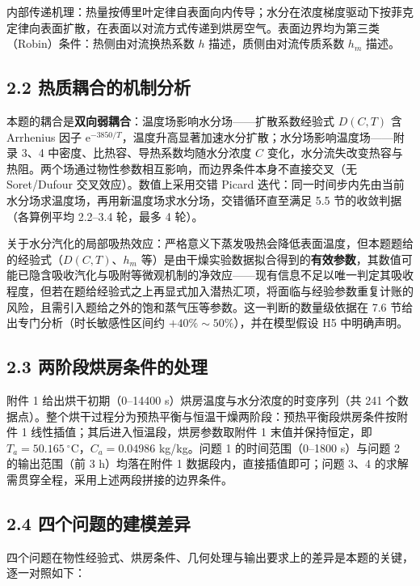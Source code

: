\documentclass[12pt,a4paper]{ctexart}
\begin{document}
内部传递机理：热量按傅里叶定律自表面向内传导\cite{incropera,yang}；水分在浓度梯度驱动下按菲克定律向表面扩散，在表面以对流方式传递到烘房空气。表面边界均为第三类（Robin）条件：热侧由对流换热系数 $h$ 描述，质侧由对流传质系数 $h_m$ 描述。

\subsection{2.2 热质耦合的机制分析}

本题的耦合是\textbf{双向弱耦合}：温度场影响水分场——扩散系数经验式 $D(C,T)$ 含 Arrhenius 因子 $\mathrm{e}^{-3850/T}$，温度升高显著加速水分扩散；水分场影响温度场——附录 3、4 中密度、比热容、导热系数均随水分浓度 $C$ 变化，水分流失改变热容与热阻。两个场通过物性参数相互影响，而边界条件本身不直接交叉（无 Soret/Dufour 交叉效应）。数值上采用交错 Picard 迭代：同一时间步内先由当前水分场求温度场，再用新温度场求水分场，交错循环直至满足 5.5 节的收敛判据（各算例平均 2.2--3.4 轮，最多 4 轮）。

关于水分汽化的局部吸热效应：严格意义下蒸发吸热会降低表面温度，但本题题给的经验式（$D(C,T)$、$h_m$ 等）是由干燥实验数据拟合得到的\textbf{有效参数}，其数值可能已隐含吸收汽化与吸附等微观机制的净效应——现有信息不足以唯一判定其吸收程度，但若在题给经验式之上再显式加入潜热汇项，将面临与经验参数重复计账的风险，且需引入题给之外的饱和蒸气压等参数。这一判断的数量级依据在 7.6 节给出专门分析（时长敏感性区间约 $+40\%\sim50\%$），并在模型假设 H5 中明确声明。

\subsection{2.3 两阶段烘房条件的处理}

附件 1 给出烘干初期（0--14400 s）烘房温度与水分浓度的时变序列（共 241 个数据点）。整个烘干过程分为预热平衡与恒温干燥两阶段：预热平衡段烘房条件按附件 1 线性插值；其后进入恒温段，烘房参数取附件 1 末值并保持恒定，即 $T_a=50.165\ ^\circ$C，$C_a=0.04986$ kg/kg。问题 1 的时间范围（0--1800 s）与问题 2 的输出范围（前 3 h）均落在附件 1 数据段内，直接插值即可；问题 3、4 的求解需贯穿全程，采用上述两段拼接的边界条件。

\subsection{2.4 四个问题的建模差异}

四个问题在物性经验式、烘房条件、几何处理与输出要求上的差异是本题的关键，逐一对照如下：
\end{document}
